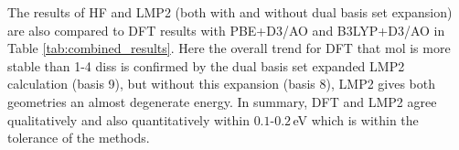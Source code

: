 \documentclass[11pt,DIV=13,BCOR=5mm,a4paper,headinclude]{scrbook}
\begin{document}
The results of HF and LMP2 (both with and without dual basis set expansion) are also compared to DFT results with PBE+D3/AO and B3LYP+D3/AO in Table \ref{tab:combined_results}.
Here the overall trend for DFT that mol is more stable than 1-4 diss is confirmed by the dual basis set expanded LMP2 calculation (basis 9), but without this expansion (basis 8), LMP2 gives both geometries an almost degenerate energy.
In summary, DFT and LMP2 agree qualitatively and also quantitatively within $0.1$-$0.2\,$eV which is within the tolerance of the methods.
\end{document}
